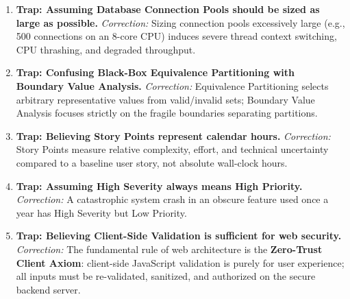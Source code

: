 \begin{enumerate}[label=\arabic*.,leftmargin=2em]
    \item \textbf{Trap: Assuming Database Connection Pools should be sized as large as possible.}
    \textit{Correction:} Sizing connection pools excessively large (e.g., 500 connections on an 8-core CPU) induces severe thread context switching, CPU thrashing, and degraded throughput.

    \item \textbf{Trap: Confusing Black-Box Equivalence Partitioning with Boundary Value Analysis.}
    \textit{Correction:} Equivalence Partitioning selects arbitrary representative values from valid/invalid sets; Boundary Value Analysis focuses strictly on the fragile boundaries separating partitions.

    \item \textbf{Trap: Believing Story Points represent calendar hours.}
    \textit{Correction:} Story Points measure relative complexity, effort, and technical uncertainty compared to a baseline user story, not absolute wall-clock hours.

    \item \textbf{Trap: Assuming High Severity always means High Priority.}
    \textit{Correction:} A catastrophic system crash in an obscure feature used once a year has High Severity but Low Priority.

    \item \textbf{Trap: Believing Client-Side Validation is sufficient for web security.}
    \textit{Correction:} The fundamental rule of web architecture is the \textbf{Zero-Trust Client Axiom}: client-side JavaScript validation is purely for user experience; all inputs must be re-validated, sanitized, and authorized on the secure backend server.
\end{enumerate}
